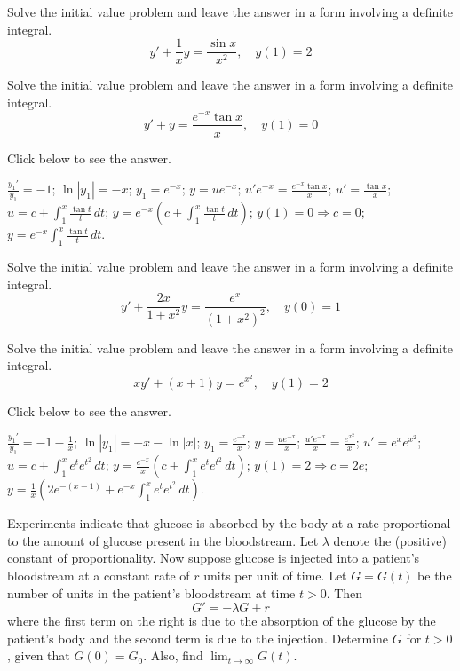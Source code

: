 \documentclass{ximera}
\begin{document}
\begin{problem}\label{exer:2.1.39} Solve the initial value problem and leave the answer in a form involving a definite integral.
$$y'+\frac{1}{x}y=\frac{\sin x}{x^2},\quad y(1)=2$$
\end{problem}

\begin{problem}\label{exer:2.1.40} Solve the initial value problem and leave the answer in a form involving a definite integral.
$$y'+y=\frac{e^{-x}\tan x}{x},\quad y(1)=0$$

Click below to see the answer.

\begin{expandable}
    $\frac{y_1'}{ y_1}=-1$;\quad
$\ln|y_1|=-x$;\quad
$y_1=e^{-x}$;\quad
$y=ue^{-x}$;\quad
$u'e^{-x}=\frac{e^{-x}\tan x}{ x}$;\quad
$u'=\frac{\tan x}{ x}$;\quad
$u=c+\int_1^x\frac{\tan t}{ t}\,dt$;\quad
$y=e^{-x}\left(c+\int_1^x\frac{\tan t}{ t}\,dt\right)$;\quad
$y(1)=0\Rightarrow c=0$;\quad
$y=e^{-x}\int_1^x\frac{\tan t}{ t}\,dt$.
\end{expandable}
\end{problem}

\begin{problem}\label{exer:2.1.41} Solve the initial value problem and leave the answer in a form involving a definite integral.
$$y'+\frac{2x}{1+x^2}y=\frac{e^x}{(1+x^2)^2}, \quad y(0)=1$$
\end{problem}

\begin{problem}\label{exer:2.1.42} Solve the initial value problem and leave the answer in a form involving a definite integral.
$$xy'+(x+1)y=e^{x^2},\quad y(1)=2$$

Click below to see the answer.

\begin{expandable}
    $\frac{y_1'}{ y_1}=-1-\frac{1}{ x}$;\quad
$\ln|y_1|=-x-\ln|x|$;\quad
$y_1=\frac{e^{-x}}{ x}$;\quad
$y=\frac{ue^{-x}}{ x}$;\quad
$\frac{u'e^{-x}}{ x}=\frac{e^{x^2}}{ x}$;\quad
$u'=e^xe^{x^2}$;\quad
$u=c+\int_1^xe^te^{t^2}\,dt$;\quad
$y=\frac{e^{-x}}{ x}\left(c+\int_1^xe^te^{t^2}\,dt\right)$;\quad
$y(1)=2\Rightarrow c=2e$;\quad
$y=\frac{1}{x}\left(2e^{-(x-1)}+e^{-x}\int_1^xe^te^{t^2}\,dt\right)$.
\end{expandable}
\end{problem}

\begin{problem}\label{exer:2.1.43}
Experiments indicate that glucose is absorbed by the body at a rate proportional to the amount of glucose present in the bloodstream. Let $\lambda$ denote the (positive) constant of proportionality. Now suppose glucose is injected into a patient's bloodstream at a constant rate of $r$ units per unit of time. Let $G=G(t)$ be the number of units in the patient's bloodstream at time $t>0$. Then
$$G'=-\lambda G+r$$
where the first term on the right is due to the absorption of the glucose by the patient's body and the second term is due to the injection. Determine $G$ for $t>0$, given that $G(0)=G_0$. Also, find $\lim_{t\to\infty}G(t)$.
\end{problem}
\end{document}
